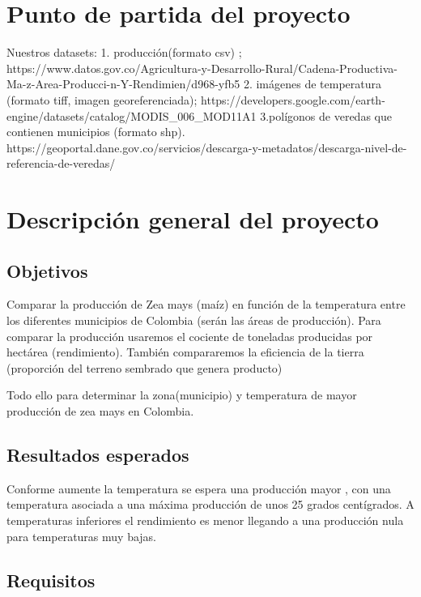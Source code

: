 \documentclass[12pt, spanish]{article}
\begin{document}
\tableofcontents 
\newpage
{}
\setcounter{page}{1}

\section{Punto de partida del proyecto}

Nuestros datasets:
1. producción(formato csv) ;
https://www.datos.gov.co/Agricultura-y-Desarrollo-Rural/Cadena-Productiva-Ma-z-Area-Producci-n-Y-Rendimien/d968-yfb5
2. imágenes de temperatura (formato tiff, imagen georeferenciada);
https://developers.google.com/earth-engine/datasets/catalog/MODIS_006_MOD11A1
3.polígonos de veredas que contienen municipios (formato shp).
https://geoportal.dane.gov.co/servicios/descarga-y-metadatos/descarga-nivel-de-referencia-de-veredas/

\section{Descripción general del proyecto}

\subsection{Objetivos}

Comparar la producción de Zea mays (maíz) en función de la temperatura entre los diferentes municipios de Colombia (serán las áreas de producción). Para comparar la producción usaremos el cociente de toneladas producidas por hectárea (rendimiento). También compararemos la eficiencia de la tierra (proporción del terreno sembrado que genera producto)

Todo ello para determinar la zona(municipio) y temperatura de mayor producción de zea mays en Colombia.

\subsection{Resultados esperados}

Conforme aumente la temperatura se espera una producción mayor , con una temperatura asociada a una máxima producción de unos 25 grados centígrados. A temperaturas inferiores el rendimiento es menor llegando a una producción nula para temperaturas muy bajas.

\subsection{Requisitos}
\end{document}
